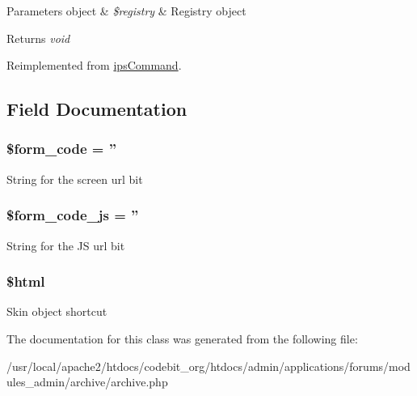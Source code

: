 \begin{DoxyParams}[1]{Parameters}
object & {\em \$registry} & Registry object \\
\hline
\end{DoxyParams}
\begin{DoxyReturn}{Returns}
{\itshape void} 
\end{DoxyReturn}


Reimplemented from \hyperlink{classips_command_afbc4e912a0604b94d47d66744c64d8ba}{ips\-Command}.



\subsection{Field Documentation}
\hypertarget{classadmin__forums__archive__archive_af28aee726fa3eb6c355d08a2ab655e03}{
\subsubsection[{\$form\-\_\-code}]{\setlength{\rightskip}{0pt plus 5cm}\$form\-\_\-code = ''}}\label{classadmin__forums__archive__archive_af28aee726fa3eb6c355d08a2ab655e03}
String for the screen url bit \hypertarget{classadmin__forums__archive__archive_ac68fe8a02a2efd63c3271179f4b4fbb7}{
\subsubsection[{\$form\-\_\-code\-\_\-js}]{\setlength{\rightskip}{0pt plus 5cm}\$form\-\_\-code\-\_\-js = ''}}\label{classadmin__forums__archive__archive_ac68fe8a02a2efd63c3271179f4b4fbb7}
String for the J\-S url bit \hypertarget{classadmin__forums__archive__archive_a6f96e7fc92441776c9d1cd3386663b40}{
\subsubsection[{\$html}]{\setlength{\rightskip}{0pt plus 5cm}\$html}}\label{classadmin__forums__archive__archive_a6f96e7fc92441776c9d1cd3386663b40}
Skin object shortcut 

The documentation for this class was generated from the following file\-:\begin{DoxyCompactItemize}
\item 
/usr/local/apache2/htdocs/codebit\-\_\-org/htdocs/admin/applications/forums/modules\-\_\-admin/archive/archive.\-php\end{DoxyCompactItemize}
